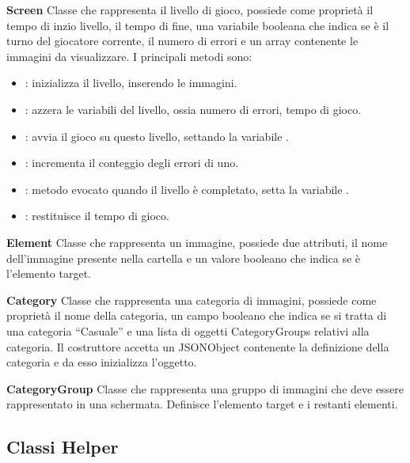 \begin{description}
\item \textbf{Screen}
Classe che rappresenta il livello di gioco, possiede come propriet\`{a} il tempo di inzio livello, il tempo di fine, una variabile booleana che indica se \`{e} il turno del giocatore corrente, il numero di errori e un array contenente le immagini da visualizzare. I principali metodi sono:
\begin{itemize}
\item {}: inizializza il livello, inserendo le immagini.
\item {}: azzera le variabili del livello, ossia numero di errori, tempo di gioco.
\item {}: avvia il gioco su questo livello, settando la variabile .
\item {}: incrementa il conteggio degli errori di uno.
\item {}: metodo evocato quando il livello \`{e} completato, setta la variabile .
\item {}: restituisce il tempo di gioco.
\end{itemize}
\item \textbf{Element}
\noindent Classe che rappresenta un immagine, possiede due attributi, il nome dell'immagine presente nella cartella  e un valore booleano che indica se \`{e} l'elemento target.
\item \textbf{Category}
Classe che rappresenta una categoria di immagini, possiede come propriet\`{a} il nome della categoria, un campo booleano che indica se si tratta di una categoria ``Casuale'' e una lista di oggetti CategoryGroups relativi alla categoria. Il costruttore accetta un JSONObject contenente la definizione della categoria e da esso inizializza l'oggetto.
\item \textbf{CategoryGroup}
Classe che rappresenta una gruppo di immagini che deve essere rappresentato in una schermata. Definisce l'elemento target e i restanti elementi.
\end{description}

\subsection{Classi Helper}

